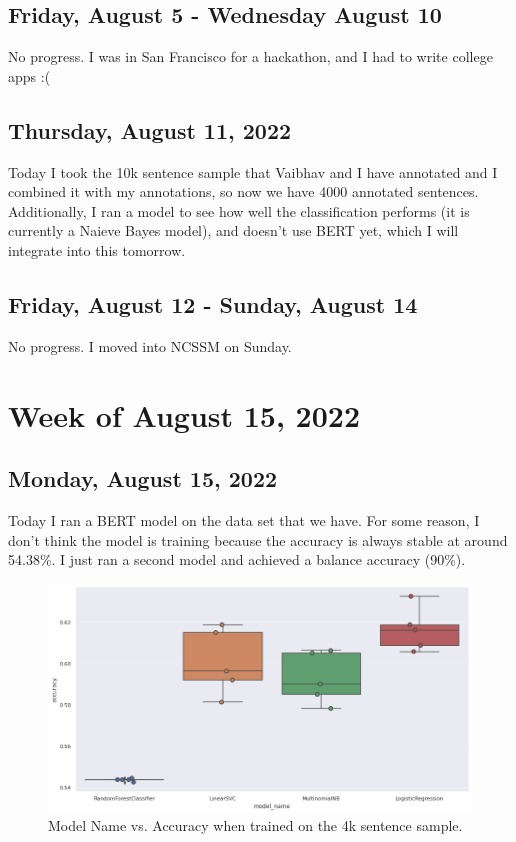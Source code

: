 \documentclass[11pt,letterpaper]{article}
\begin{document}
\subsection{Friday, August 5 - Wednesday August 10}
No progress. I was in San Francisco for a hackathon, and I had to write college apps :(

\subsection{Thursday, August 11, 2022}
Today I took the 10k sentence sample that Vaibhav and I have annotated and I combined it with my annotations, so now we have 4000 annotated sentences. Additionally, I ran a model to see how well the classification performs (it is currently a Naieve Bayes model), and doesn't use BERT yet, which I will integrate into this tomorrow.


\subsection{Friday, August 12 - Sunday, August 14}
No progress. I moved into NCSSM on Sunday.

\section{Week of August 15, 2022}
\subsection{Monday, August 15, 2022}
Today I ran a BERT model on the data set that we have. For some reason, I don't think the model is training because the accuracy is always stable at around 54.38\%. I just ran a second model and achieved a balance accuracy (90\%).

\begin{figure}
    \centering
    \includegraphics[scale=0.4]{images/accuracies.png}
    \caption{Model Name vs. Accuracy when trained on the 4k sentence sample.}
    \label{fig:acc_4k_sample}
\end{figure}
\end{document}
